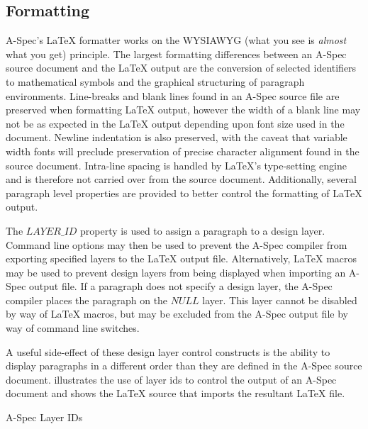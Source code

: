 \documentclass[letterpaper,10pt,draft]{book}
\begin{document}
\subsection{Formatting}
   \label{sect:TeXFormat}

A-Spec's \LaTeX{} formatter works on the WYSIAWYG (what you see is {\it almost} what
you get) principle.  The largest formatting differences between an A-Spec source
document and the \LaTeX{} output are the conversion of selected identifiers to mathematical
symbols and the graphical structuring of paragraph environments.  Line-breaks and
blank lines found in an A-Spec source file are preserved when formatting \LaTeX{}
output, however the width of a blank line may not be as expected in the \LaTeX{}
output depending upon font size used in the document.  Newline indentation is also
preserved, with the caveat that variable width fonts will preclude preservation
of precise character alignment found in the source document.  Intra-line spacing
is handled by \LaTeX{}'s type-setting engine and is therefore not carried over from
the source document.  Additionally, several paragraph level properties are provided
to better control the formatting of \LaTeX{} output.

The $LAYER\_ID$ property is used to assign a paragraph to a design layer.  Command
line options may then be used to prevent the A-Spec compiler from exporting specified
layers to the \LaTeX{} output file.  Alternatively, \LaTeX{} macros may be used to
prevent design layers from being displayed when importing an A-Spec output file.
If a paragraph does not specify a design layer, the A-Spec compiler places the paragraph
on the $NULL$ layer.  This layer cannot be disabled by way of \LaTeX{} macros, but
may be excluded from the A-Spec output file by way of command line switches.

A useful side-effect of these design layer control constructs is the ability to
display paragraphs in a different order than they are defined in the A-Spec source
document.   illustrates the use of layer ids to control the
output of an A-Spec document and  shows the \LaTeX{} source
that imports the resultant \LaTeX{} file.

\begin{example}
\begin{minipage}[t]{0.49\linewidth}
   
\end{minipage}
\begin{minipage}[t]{0.49\linewidth}
   \def\LAYERIDbasket{1}
   \azsch
   
   \def\LAYERIDbasket{0}
   \def\LAYERIDfruUit{1}
   
   \def\LAYERIDfruUit{0}
\end{minipage}

   \caption{A-Spec Layer IDs}
   \label{ex:LayerIDOZ}
\end{example}
\end{document}
